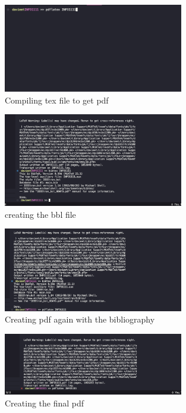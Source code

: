 \documentclass[a4paper, 11pt]{report}
\begin{document}
\begin{figure}[H]
    \centering
    \includegraphics[width=0.7\textwidth]{proof2}
    \caption{Compiling tex file to get pdf}
\end{figure}

\begin{figure}[H]
    \centering
    \includegraphics[width=0.7\textwidth]{proof3}
    \caption{creating the bbl file}
\end{figure}

\begin{figure}[H]
    \centering
    \includegraphics[width=0.7\textwidth]{proof4}
    \caption{Creating pdf again with the bibliography}
\end{figure}

\begin{figure}[H]
    \centering
    \includegraphics[width=0.7\textwidth]{proof5}
    \caption{Creating the final pdf}
\end{figure}
\end{document}
